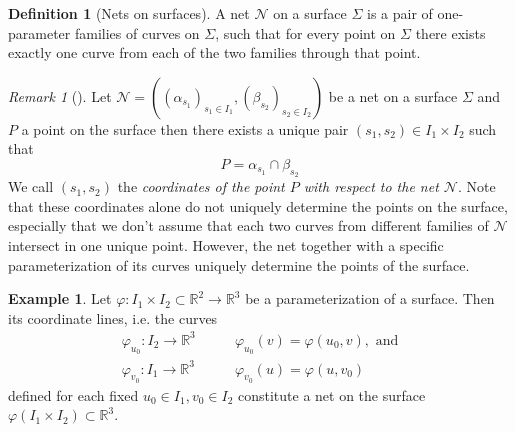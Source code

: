 \documentclass[12pt,a4paper]{article}
\theoremstyle{definition}
\newtheorem{definition}{Definition}[section]
\theoremstyle{remark}
\newtheorem{remark}{\textit{Remark}}[section]
\theoremstyle{definition}
\newtheorem{example}{Example}[section]
\begin{document}
\begin{definition}[Nets on surfaces]
\label{def:nets-on-surfaces}
A net $\mathcal{N}$ on a surface $\Sigma$ is a pair of one-parameter families of curves on $\Sigma$, such that for every point on $\Sigma$ there exists exactly one curve from each of the two families through that point.
\end{definition}

\begin{remark}[]
\label{rm:label}
Let $\mathcal{N} = \left( (\alpha_{s_{1}})_{s_{1} \in I_1}, (\beta_{s_{2}})_{s_{2} \in I_2} \right)$ be a net on a surface
$\Sigma$ and $P$ a point on the surface then there exists a unique pair $(s_{1}, s_{2}) \in I_{1}\times I_{2}$ such that
\[
    P = \alpha_{s_1} \cap \beta_{s_2}
\]
We call $(s_1, s_2)$ the \textit{coordinates of the point $P$ with respect to the net $\mathcal{N}$}. Note that these coordinates alone do not uniquely determine the points on the surface, especially that we don't assume that each two curves from different families of $\mathcal{N}$ intersect in one unique point. However, the net together with a specific parameterization of its curves uniquely determine the points of the surface.
\end{remark}

\begin{example}
\label{ex:nets-on-surfaces}
Let $\varphi : I_{1} \times I_{2} \subset \mathbb{R}^2 \to \mathbb{R}^3$ be a parameterization of a surface. Then its
coordinate lines, i.e. the curves
\begin{align*}
    \varphi_{u_0} : I_{2} \to \mathbb{R}^3 &\quad \quad \varphi_{u_0}(v) = \varphi(u_0, v), \text{ and} \\
    \varphi_{v_0} : I_{1} \to \mathbb{R}^3 &\quad \quad \varphi_{v_0}(u) = \varphi(u, v_0)
\end{align*}
defined for each fixed $u_{0} \in I_1, v_{0} \in I_2$ constitute a net on the surface $\varphi\left( I_1 \times I_{2}
\right) \subset \mathbb{R}^3$.
\end{example}
\end{document}
